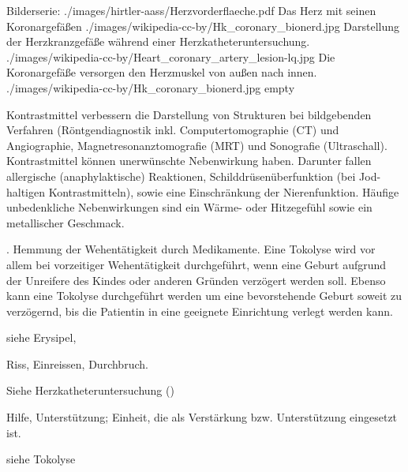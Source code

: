 \begin{description}
  \begin{PictureSeriesWide}{}{Bilderserie:
    }
    {./images/hirtler-aass/Herzvorderflaeche.pdf}
    {Das Herz mit seinen Koronargefäßen }
    {./images/wikipedia-cc-by/Hk_coronary_bionerd.jpg}
    {Darstellung der
    Herzkranzgefäße während einer Herzkatheteruntersuchung.
    }
    {./images/wikipedia-cc-by/Heart_coronary_artery_lesion-lq.jpg}
    {Die Koronargefäße versorgen den
    Herzmuskel von außen nach innen. } {./images/wikipedia-cc-by/Hk_coronary_bionerd.jpg}
    {empty}
    {}
  \end{PictureSeriesWide}
  \item[\IX{Kontrastmittel}] \label{topic:kontrasmittel}
  Kontrastmittel verbessern die Darstellung von Strukturen
  bei bildgebenden Verfahren (Röntgendiagnostik inkl.
  Computertomographie (CT) und Angiographie,
  Magnetresonanztomografie (MRT) und Sonografie (Ultraschall). Kontrastmittel können
  unerwünschte Nebenwirkung haben. Darunter fallen
  allergische (anaphylaktische) Reaktionen,
  Schilddrüsenüberfunktion (bei Jod-haltigen
  Kontrastmitteln), sowie eine Einschränkung der
  Nierenfunktion. Häufige unbedenkliche Nebenwirkungen sind
  ein Wärme- oder Hitzegefühl sowie ein metallischer
  Geschmack.
  \item[\IX{Tokolyse}]  . Hemmung
  der Wehentätigkeit durch Medikamente. Eine Tokolyse wird
  vor allem bei vorzeitiger Wehentätigkeit durchgeführt,
  wenn eine Geburt aufgrund der Unreifere des Kindes oder
  anderen Gründen verzögert werden soll. Ebenso kann eine
  Tokolyse durchgeführt werden um eine bevorstehende Geburt
  soweit zu verzögernd, bis die Patientin in eine geeignete
  Einrichtung verlegt werden kann.
  \item[\IX{retten}]
  \item[\IX{Rotlauf}] siehe Erysipel, 
  \item[\IX{Ruptur}] Riss, Einreissen, Durchbruch.
  \item[\IX{Sofortbehandlung}]
  \item[\IX{Sofortmaßnahmen, lebensrettende}]
  \item[Stent] Siehe Herzkatheteruntersuchung
  ()
  \item[\IX{Sukkurs}] Hilfe, Unterstützung; Einheit, die
  als Verstärkung bzw. Unterstützung eingesetzt ist.
  \item[\IX{Wehenhemmung}] siehe Tokolyse
\end{description}
